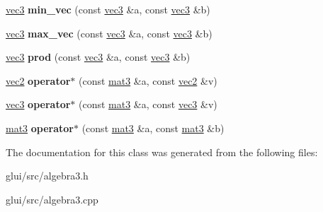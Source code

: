 \begin{DoxyCompactItemize}
\item 
\hypertarget{classvec3_a6e9f78953f1d63ec8cee3fb16b828cc8}{\hyperlink{classvec3}{vec3} {\bfseries min\-\_\-vec} (const \hyperlink{classvec3}{vec3} \&a, const \hyperlink{classvec3}{vec3} \&b)}\label{classvec3_a6e9f78953f1d63ec8cee3fb16b828cc8}

\item 
\hypertarget{classvec3_a6b61534e725e4a5fea030d02daa3d43a}{\hyperlink{classvec3}{vec3} {\bfseries max\-\_\-vec} (const \hyperlink{classvec3}{vec3} \&a, const \hyperlink{classvec3}{vec3} \&b)}\label{classvec3_a6b61534e725e4a5fea030d02daa3d43a}

\item 
\hypertarget{classvec3_aa4e6ac89db67a3ca3f78380dac421502}{\hyperlink{classvec3}{vec3} {\bfseries prod} (const \hyperlink{classvec3}{vec3} \&a, const \hyperlink{classvec3}{vec3} \&b)}\label{classvec3_aa4e6ac89db67a3ca3f78380dac421502}

\item 
\hypertarget{classvec3_a307ae299187b6d9e75b1a7730b6213c2}{\hyperlink{classvec2}{vec2} {\bfseries operator$\ast$} (const \hyperlink{classmat3}{mat3} \&a, const \hyperlink{classvec2}{vec2} \&v)}\label{classvec3_a307ae299187b6d9e75b1a7730b6213c2}

\item 
\hypertarget{classvec3_a46bbeb7eed270ad69b34c3a1b93eb050}{\hyperlink{classvec3}{vec3} {\bfseries operator$\ast$} (const \hyperlink{classmat3}{mat3} \&a, const \hyperlink{classvec3}{vec3} \&v)}\label{classvec3_a46bbeb7eed270ad69b34c3a1b93eb050}

\item 
\hypertarget{classvec3_a0df0a7a0901cee5daec15003ee3594fc}{\hyperlink{classmat3}{mat3} {\bfseries operator$\ast$} (const \hyperlink{classmat3}{mat3} \&a, const \hyperlink{classmat3}{mat3} \&b)}\label{classvec3_a0df0a7a0901cee5daec15003ee3594fc}

\end{DoxyCompactItemize}


The documentation for this class was generated from the following files\-:\begin{DoxyCompactItemize}
\item 
glui/src/algebra3.\-h\item 
glui/src/algebra3.\-cpp\end{DoxyCompactItemize}
